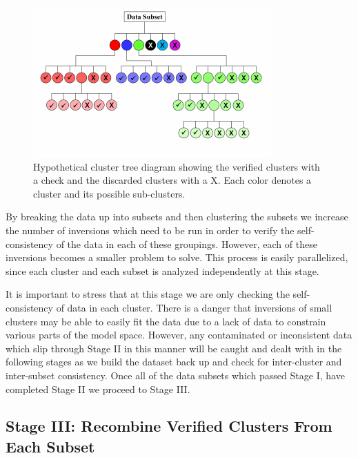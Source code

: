 \documentclass[final,authoryear,5p,times,twocolumn]{elsarticle}
\begin{document}
\begin{figure} [h!]
\begin{center}
   \includegraphics[trim=0cm 0cm 0cm 0cm, clip=true,width=0.75\linewidth]{./Figures/Fig14.pdf}
\end{center}
\caption{Hypothetical cluster tree diagram showing the verified clusters with a check and the discarded clusters with a X. Each color denotes a cluster and its possible sub-clusters.}
\label{fig:ClusterTree}
\end{figure}

By breaking the data up into subsets and then clustering the subsets we increase the number of inversions which need to be run in order to verify the self-consistency of the data in each of these groupings. However, each of these inversions becomes a smaller problem to solve. This process is easily parallelized, since each cluster and each subset is analyzed independently at this stage.

It is important to stress that at this stage we are only checking the self-consistency of data in each cluster. There is a danger that inversions of small clusters may be able to easily fit the data due to a lack of data to constrain various parts of the model space. However, any contaminated or inconsistent data which slip through Stage II in this manner will be caught and dealt with in the following stages as we build the dataset back up and check for inter-cluster and inter-subset consistency. Once all of the data subsets which passed Stage I, have completed Stage II we proceed to Stage III.

\subsection{Stage III: Recombine Verified Clusters From Each Subset}
\label{Data_Quality_Control:StageIII_Recombine_Clusters}
\end{document}
